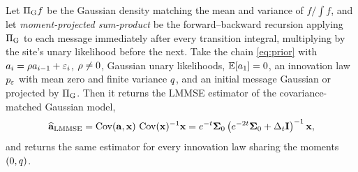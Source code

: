
\begin{proposition}
\label{prop:lmmse}
Let $\Pi_{\mathrm{G}} f$ be the Gaussian density matching the mean and variance of $f/\!\int\!f$, and let
\emph{moment-projected sum-product} be the forward--backward recursion applying $\Pi_{\mathrm{G}}$ to each
message immediately after every transition integral, multiplying by the site's unary likelihood
before the next. Take the chain \eqref{eq:prior} with $a_i = \rho a_{i-1} + \varepsilon_i$,
$\rho\neq0$, Gaussian unary likelihoods, $\mathbb{E}[a_1]=0$, an innovation law $p_{\varepsilon}$ with mean zero
and finite variance $q$, and an initial message Gaussian or projected by $\Pi_{\mathrm{G}}$. Then it
returns the LMMSE estimator of the covariance-matched Gaussian model,
\begin{equation}
\label{eq:lmmse}
\widehat{\mathbf{a}}_{\mathrm{LMMSE}}
= \operatorname{Cov}(\mathbf{a},\mathbf{x})\,\operatorname{Cov}(\mathbf{x})^{-1} \mathbf{x}
= e^{-t}\mathbf{\Sigma}_0\left(e^{-2t}\mathbf{\Sigma}_0 + \Delta_t \mathbf{I}\right)^{-1} \mathbf{x} ,
\end{equation}
and returns the same estimator for every innovation law sharing the moments $(0,q)$.
\end{proposition}
